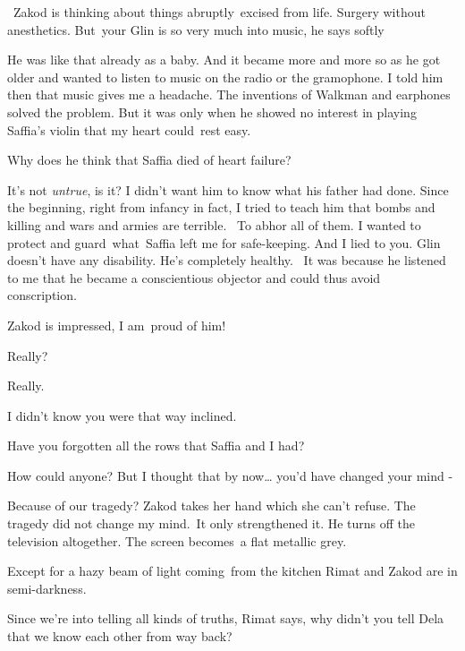 \documentclass[twoside,11pt]{book}
\begin{document}
~Zakod is thinking about things abruptly~excised from life. Surgery without anesthetics. {\textquotedbl}But~your Glin is
so very much into music,{\textquotedbl} he says softly

{\textquotedbl}He was like that already as a baby. And it became more and more so as he got older and wanted to listen
to music on the radio or the gramophone. I told him then that music gives me a headache. The inventions of Walkman and
earphones solved the problem. But it was only when he showed no interest in playing Saffia's violin that my heart
could\ rest easy.{\textquotedbl} 

{\textquotedbl}Why does he think that Saffia died of heart failure?{\textquotedbl} ~

{\textquotedbl}It's not\textit{ untrue}, is it? I didn't want him to know what his father had done. Since the beginning,
right from infancy in fact, I tried to teach him that bombs and killing and wars and armies are terrible.~ To abhor all
of them. I wanted to protect and guard~what~Saffia left me for safe-keeping. And I lied to you. Glin doesn't have any
disability. He's completely healthy. ~It was because he listened to me that he became a conscientious objector and
could thus avoid conscription.{\textquotedbl}{\ }

Zakod is impressed, {\textquotedbl}I am\ proud of him!{\textquotedbl} 

{\textquotedbl}Really?{\textquotedbl} 

{\textquotedbl}Really.{\textquotedbl}~ 

{\textquotedbl}I didn't know you were that way inclined.{\textquotedbl} 

{\textquotedbl}Have you forgotten all the rows that Saffia and I had?{\textquotedbl} 

{\textquotedbl}How could anyone?  But I thought that by now{\dots} you'd have changed your mind -{\textquotedbl}

{\textquotedbl}Because of our tragedy?{\textquotedbl} Zakod takes her hand which she can't refuse. {\textquotedbl}The
tragedy did not change my mind.\ It only strengthened it.{\textquotedbl} He turns off the television altogether. The
screen becomes~a flat metallic grey.

Except for a hazy beam of light coming{\ }from the kitchen Rimat and
Zakod are in semi-darkness. 

{\textquotedbl}Since we're into telling all kinds of truths,{\textquotedbl} Rimat says, {\textquotedbl}why didn't you
tell Dela that we know each other from way back?{\textquotedbl} 
\end{document}
